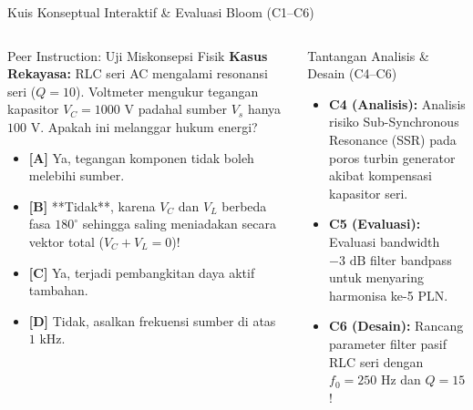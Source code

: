 \documentclass[aspectratio=169,10pt]{beamer}
\begin{document}
\begin{frame}{Kuis Konseptual Interaktif \& Evaluasi Bloom (C1--C6)}
  \begin{columns}[t]
    \begin{alertblock}{Peer Instruction: Uji Miskonsepsi Fisik}
      \footnotesize
      \textbf{Kasus Rekayasa:} RLC seri AC mengalami resonansi seri ($Q = 10$). Voltmeter mengukur tegangan kapasitor $V_C = 1000\text{ V}$ padahal sumber $V_s$ hanya $100\text{ V}$. Apakah ini melanggar hukum energi?
      \vspace{0.05cm}
      \begin{itemize}\setlength{\itemsep}{1pt}
        \item \textbf{[A]} Ya, tegangan komponen tidak boleh melebihi sumber.
        \item \textbf{[B]} **Tidak**, karena $V_C$ dan $V_L$ berbeda fasa $180^\circ$ sehingga saling meniadakan secara vektor total ($V_C + V_L = 0$)!
        \item \textbf{[C]} Ya, terjadi pembangkitan daya aktif tambahan.
        \item \textbf{[D]} Tidak, asalkan frekuensi sumber di atas $1\text{ kHz}$.
      \end{itemize}
    \end{alertblock}

    \begin{block}{Tantangan Analisis \& Desain (C4--C6)}
      \footnotesize
      \begin{itemize}\setlength{\itemsep}{2pt}
        \item \textbf{C4 (Analisis):} Analisis risiko Sub-Synchronous Resonance (SSR) pada poros turbin generator akibat kompensasi kapasitor seri.
        \item \textbf{C5 (Evaluasi):} Evaluasi bandwidth $-3\text{ dB}$ filter bandpass untuk menyaring harmonisa ke-5 PLN.
        \item \textbf{C6 (Desain):} Rancang parameter filter pasif RLC seri dengan $f_0 = 250\text{ Hz}$ dan $Q = 15$!
      \end{itemize}
    \end{block}
  \end{columns}
\end{frame}
\end{document}
